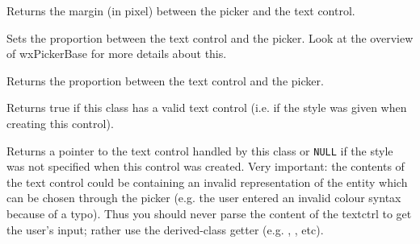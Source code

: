 
Returns the margin (in pixel) between the picker and the text control.


\label{wxpickerbasesettextctrlproportion}


Sets the proportion between the text control and the picker.
Look at the overview of wxPickerBase for more details about this.


\label{wxpickerbasesgettextctrlproportion}


Returns the proportion between the text control and the picker.


\label{wxpickerbaseshastextctrl}


Returns true if this class has a valid text control (i.e. if the  style was
given when creating this control).


\label{wxpickerbasesgetextctrl}


Returns a pointer to the text control handled by this class or \texttt{NULL} if the  style was not specified when this control was created.
Very important: the contents of the text control could be containing an invalid representation of the entity which can be chosen through the picker (e.g. the user entered an invalid colour syntax because of a typo). Thus you should never parse the content of the textctrl to get the user's input; rather use the derived-class getter (e.g. , , etc).
